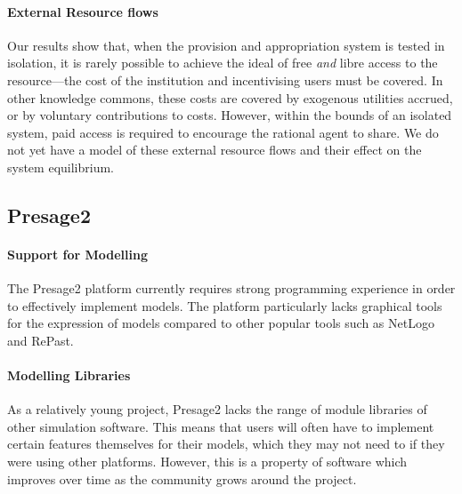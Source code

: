 \paragraph{External Resource flows}
Our results show that, when the provision and appropriation system is tested in
isolation, it is rarely possible to achieve the ideal of free \emph{and} libre
access to the resource---the cost of the institution and incentivising users
must be covered. In other knowledge commons, these costs are covered by
exogenous utilities accrued, or by voluntary contributions to costs. However,
within the bounds of an isolated system, paid access is required to encourage the
rational agent to share. We do not yet have a model of these external resource
flows and their effect on the system equilibrium.


\subsection{Presage2}

\paragraph{Support for Modelling} The Presage2 platform currently requires
strong programming experience in order to effectively implement models. The
platform particularly lacks graphical tools for the expression of models
compared to other popular tools such as NetLogo and RePast.

\paragraph{Modelling Libraries} As a relatively young project, Presage2 lacks
the range of module libraries of other simulation software. This means that
users will often have to implement certain features themselves for their
models, which they may not need to if they were using other platforms.
However, this is a property of software which improves over time as the community
grows around the project.

